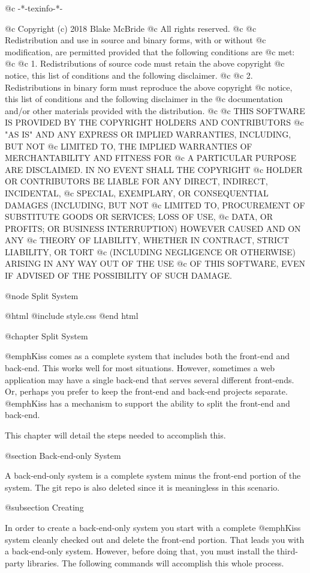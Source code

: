 @c -*-texinfo-*-

@c  Copyright (c) 2018 Blake McBride
@c  All rights reserved.
@c
@c  Redistribution and use in source and binary forms, with or without
@c  modification, are permitted provided that the following conditions are
@c  met:
@c
@c  1. Redistributions of source code must retain the above copyright
@c  notice, this list of conditions and the following disclaimer.
@c
@c  2. Redistributions in binary form must reproduce the above copyright
@c  notice, this list of conditions and the following disclaimer in the
@c  documentation and/or other materials provided with the distribution.
@c
@c  THIS SOFTWARE IS PROVIDED BY THE COPYRIGHT HOLDERS AND CONTRIBUTORS
@c  "AS IS" AND ANY EXPRESS OR IMPLIED WARRANTIES, INCLUDING, BUT NOT
@c  LIMITED TO, THE IMPLIED WARRANTIES OF MERCHANTABILITY AND FITNESS FOR
@c  A PARTICULAR PURPOSE ARE DISCLAIMED. IN NO EVENT SHALL THE COPYRIGHT
@c  HOLDER OR CONTRIBUTORS BE LIABLE FOR ANY DIRECT, INDIRECT, INCIDENTAL,
@c  SPECIAL, EXEMPLARY, OR CONSEQUENTIAL DAMAGES (INCLUDING, BUT NOT
@c  LIMITED TO, PROCUREMENT OF SUBSTITUTE GOODS OR SERVICES; LOSS OF USE,
@c  DATA, OR PROFITS; OR BUSINESS INTERRUPTION) HOWEVER CAUSED AND ON ANY
@c  THEORY OF LIABILITY, WHETHER IN CONTRACT, STRICT LIABILITY, OR TORT
@c  (INCLUDING NEGLIGENCE OR OTHERWISE) ARISING IN ANY WAY OUT OF THE USE
@c  OF THIS SOFTWARE, EVEN IF ADVISED OF THE POSSIBILITY OF SUCH DAMAGE.

@node Split System

@html
@include style.css
@end html

@chapter Split System

@emph{Kiss} comes as a complete system that includes both the front-end and back-end.
This works well for most situations.  However, sometimes a web application may have a
single back-end that serves several different front-ends.  Or, perhaps you prefer to keep
the front-end and back-end projects separate.  @emph{Kiss} has a mechanism to support the
ability to split the front-end and back-end.

This chapter will detail the steps needed to accomplish this.

@section Back-end-only System

A back-end-only system is a complete system minus the front-end portion of the system.
The git repo is also deleted since it is meaningless in this scenario.

@subsection Creating

In order to create a back-end-only system you start with a complete
@emph{Kiss} system cleanly checked out and delete the front-end
portion.  That leads you with a back-end-only system.  However, before
doing that, you must install the third-party libraries.  The following
commands will accomplish this whole process.


